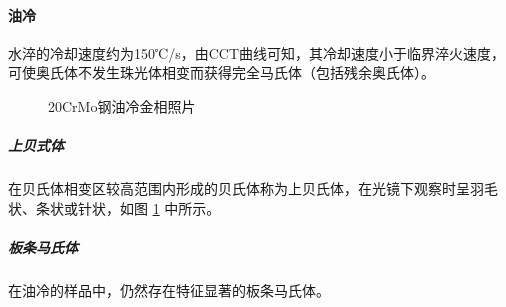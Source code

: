 \documentclass[12pt]{ctexart}
\begin{document}
\paragraph{油冷}
水淬的冷却速度约为150℃/s，由CCT曲线可知，其冷却速度小于临界淬火速度，可使奥氏体不发生珠光体相变而获得完全马氏体（包括残余奥氏体）。
\begin{figure}[ht!]
  \centering
  \caption{20CrMo钢油冷金相照片}
  \label{20oil}
\end{figure}
\subparagraph{上贝式体}
在贝氏体相变区较高范围内形成的贝氏体称为上贝氏体，在光镜下观察时呈羽毛状、条状或针状，如图 \ref{20oil} 中所示。
\subparagraph{板条马氏体}
在油冷的样品中，仍然存在特征显著的板条马氏体。
\end{document}
